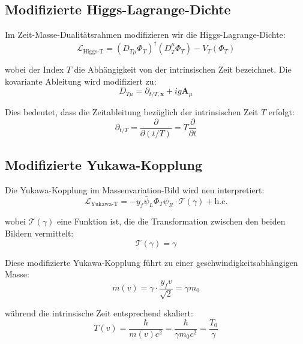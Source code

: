 \documentclass[a4paper,12pt]{article}
\begin{document}
	\subsection{Modifizierte Higgs-Lagrange-Dichte}
	
	Im Zeit-Masse-Dualitätsrahmen modifizieren wir die Higgs-Lagrange-Dichte:
	\begin{equation}
		\mathcal{L}_{\text{Higgs-T}} = (D_{T\mu} \Phi_T)^\dagger (D_T^\mu \Phi_T) - V_T(\Phi_T)
	\end{equation}
	
	wobei der Index $T$ die Abhängigkeit von der intrinsischen Zeit bezeichnet. Die kovariante Ableitung wird modifiziert zu:
	\begin{equation}
		D_{T\mu} = \partial_{t/T, \mathbf{x}} + ig\mathbf{A}_\mu
	\end{equation}
	
	Dies bedeutet, dass die Zeitableitung bezüglich der intrinsischen Zeit $T$ erfolgt:
	\begin{equation}
		\partial_{t/T} = \frac{\partial}{\partial(t/T)} = T\frac{\partial}{\partial t}
	\end{equation}
	
	\subsection{Modifizierte Yukawa-Kopplung}
	
	Die Yukawa-Kopplung im Massenvariation-Bild wird neu interpretiert:
	\begin{equation}
		\mathcal{L}_{\text{Yukawa-T}} = -y_f \bar{\psi}_L \Phi_T \psi_R \cdot \mathcal{T}(\gamma) + \text{h.c.}
	\end{equation}
	
	wobei $\mathcal{T}(\gamma)$ eine Funktion ist, die die Transformation zwischen den beiden Bildern vermittelt:
	\begin{equation}
		\mathcal{T}(\gamma) = \gamma
	\end{equation}
	
	Diese modifizierte Yukawa-Kopplung führt zu einer geschwindigkeitsabhängigen Masse:
	\begin{equation}
		m(v) = \gamma \cdot \frac{y_f v}{\sqrt{2}} = \gamma m_0
	\end{equation}
	
	während die intrinsische Zeit entsprechend skaliert:
	\begin{equation}
		T(v) = \frac{\hbar}{m(v)c^2} = \frac{\hbar}{\gamma m_0 c^2} = \frac{T_0}{\gamma}
	\end{equation}
	
\end{document}
